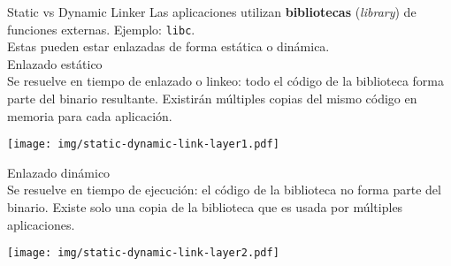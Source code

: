 \documentclass[aspectratio=169]{beamer}
\begin{document}
\begin{frame}[fragile,t]{Static vs Dynamic Linker}
    Las aplicaciones utilizan \textbf{bibliotecas} (\emph{library}) de funciones externas. Ejemplo: \texttt{libc}.\\
    Estas pueden estar enlazadas de forma estática o dinámica.\\
    \pause
    \vspace{0.2cm}
    \textcolor{naranjauca}{Enlazado estático}\\
    Se resuelve en tiempo de enlazado o linkeo: todo el código de la biblioteca forma parte del binario resultante.
    Existirán múltiples copias del mismo código en memoria para cada aplicación.
    \begin{center}
    \texttt{[image: img/static-dynamic-link-layer1.pdf]}
    \end{center}
    \pause
    \textcolor{naranjauca}{Enlazado dinámico}\\
    Se resuelve en tiempo de ejecución: el código de la biblioteca no forma parte del binario.
    Existe solo una copia de la biblioteca que es usada por múltiples aplicaciones.
    \begin{center}
    \texttt{[image: img/static-dynamic-link-layer2.pdf]}
    \end{center}
\end{frame}

\end{document}
